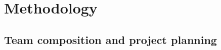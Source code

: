 \documentclass[11pt,a4paper]{article}
\begin{document}

\section{Methodology}



\subsection{Team composition and project planning}
\end{document}

